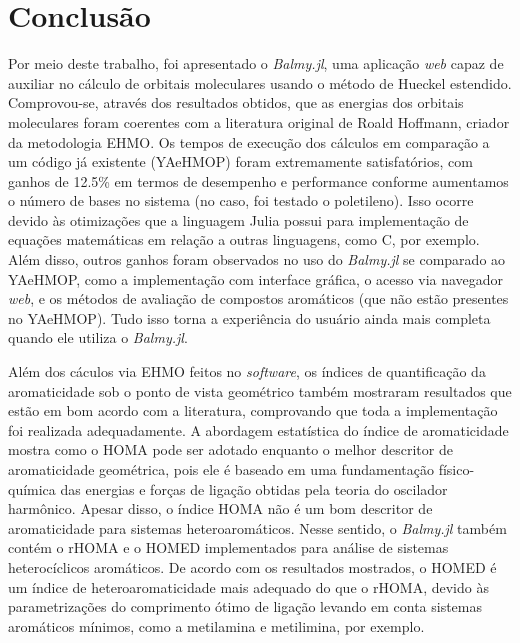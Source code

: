 \chapter{Conclusão}

Por meio deste trabalho, foi apresentado o \textit{Balmy.jl}, uma aplicação \textit{web} capaz de auxiliar no cálculo de orbitais moleculares usando o método de Hueckel estendido. Comprovou-se, através dos resultados obtidos, que as energias dos orbitais moleculares foram coerentes com a literatura original de Roald Hoffmann, criador da metodologia \gls{EHMO}. Os tempos de execução dos cálculos em comparação a um código já existente (\gls{YAeHMOP}) foram extremamente satisfatórios, com ganhos de 12.5\% em termos de desempenho e performance conforme aumentamos o número de bases no sistema (no caso, foi testado o poletileno). Isso ocorre devido às otimizações que a linguagem Julia possui para implementação de equações matemáticas em relação a outras linguagens, como C, por exemplo. Além disso, outros ganhos foram observados no uso do \textit{Balmy.jl} se comparado ao \gls{YAeHMOP}, como a implementação com interface gráfica, o acesso via navegador \textit{web}, e os métodos de avaliação de compostos aromáticos (que não estão presentes no \gls{YAeHMOP}). Tudo isso torna a experiência do usuário ainda mais completa quando ele utiliza o \textit{Balmy.jl}.

Além dos cáculos via \gls{EHMO} feitos no \textit{software}, os índices de quantificação da aromaticidade sob o ponto de vista geométrico também mostraram resultados que estão em bom acordo com a literatura, comprovando que toda a implementação foi realizada adequadamente. A abordagem estatística do índice de aromaticidade mostra como o \gls{HOMA} pode ser adotado enquanto o melhor descritor de aromaticidade geométrica, pois ele é baseado em uma fundamentação físico-química das energias e forças de ligação obtidas pela teoria do oscilador harmônico. Apesar disso, o índice \gls{HOMA} não é um bom descritor de aromaticidade para sistemas heteroaromáticos. Nesse sentido, o \textit{Balmy.jl} também contém o \gls{rHOMA} e o \gls{HOMED} implementados para análise de sistemas heterocíclicos aromáticos. De acordo com os resultados mostrados, o \gls{HOMED} é um índice de heteroaromaticidade mais adequado do que o \gls{rHOMA}, devido às parametrizações do comprimento ótimo de ligação levando em conta sistemas aromáticos mínimos, como a metilamina e metilimina, por exemplo.


